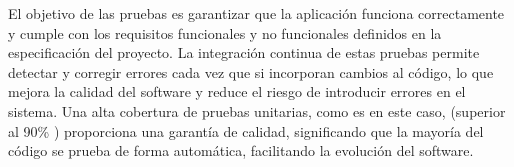 El objetivo de las pruebas es garantizar que la aplicación funciona correctamente y cumple con los requisitos funcionales y no funcionales definidos en la especificación del proyecto.
La integración continua de estas pruebas permite detectar y corregir errores cada vez que si incorporan cambios al código, lo que mejora la calidad del software y reduce el riesgo de introducir errores en el sistema.
Una alta cobertura de pruebas unitarias, como es en este caso, (superior al 90\% ) proporciona una garantía de calidad, significando que la mayoría del código se prueba de forma automática, facilitando la evolución del software.